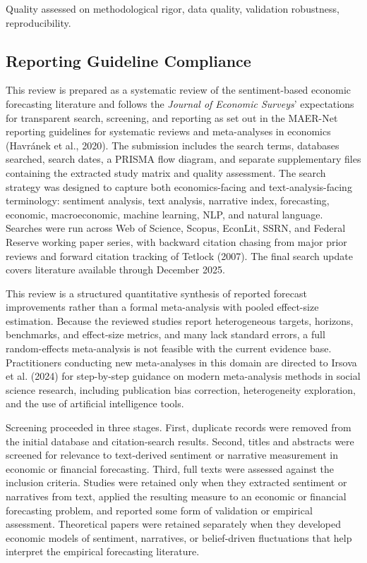 \documentclass[11pt,twocolumn]{article}
\begin{document}
Quality assessed on methodological rigor, data quality, validation robustness, reproducibility.

\subsection{Reporting Guideline Compliance}

This review is prepared as a systematic review of the sentiment-based economic forecasting literature and follows the \textit{Journal of Economic Surveys}' expectations for transparent search, screening, and reporting as set out in the MAER-Net reporting guidelines for systematic reviews and meta-analyses in economics (Havr\'anek et al., 2020). The submission includes the search terms, databases searched, search dates, a PRISMA flow diagram, and separate supplementary files containing the extracted study matrix and quality assessment. The search strategy was designed to capture both economics-facing and text-analysis-facing terminology: sentiment analysis, text analysis, narrative index, forecasting, economic, macroeconomic, machine learning, NLP, and natural language. Searches were run across Web of Science, Scopus, EconLit, SSRN, and Federal Reserve working paper series, with backward citation chasing from major prior reviews and forward citation tracking of Tetlock (2007). The final search update covers literature available through December 2025.

This review is a structured quantitative synthesis of reported forecast improvements rather than a formal meta-analysis with pooled effect-size estimation. Because the reviewed studies report heterogeneous targets, horizons, benchmarks, and effect-size metrics, and many lack standard errors, a full random-effects meta-analysis is not feasible with the current evidence base. Practitioners conducting new meta-analyses in this domain are directed to Irsova et al. (2024) for step-by-step guidance on modern meta-analysis methods in social science research, including publication bias correction, heterogeneity exploration, and the use of artificial intelligence tools.

Screening proceeded in three stages. First, duplicate records were removed from the initial database and citation-search results. Second, titles and abstracts were screened for relevance to text-derived sentiment or narrative measurement in economic or financial forecasting. Third, full texts were assessed against the inclusion criteria. Studies were retained only when they extracted sentiment or narratives from text, applied the resulting measure to an economic or financial forecasting problem, and reported some form of validation or empirical assessment. Theoretical papers were retained separately when they developed economic models of sentiment, narratives, or belief-driven fluctuations that help interpret the empirical forecasting literature.
\end{document}
